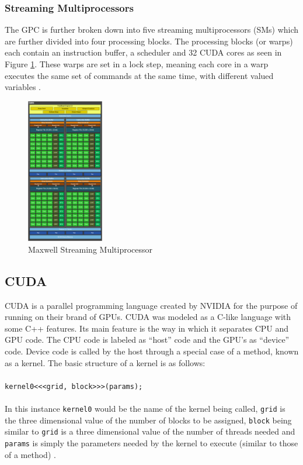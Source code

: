 \subsubsection{Streaming Multiprocessors}\label{gpu:ssec:smm}
The GPC is further broken down into five streaming multiprocessors (SMs) which are further divided into four processing blocks. The processing blocks (or warps) each contain an instruction buffer, a scheduler and 32 CUDA cores as seen in Figure \ref{gpu:img:smm}. These warps are set in a lock step, meaning each core in a warp executes the same set of commands at the same time, with different valued variables \citep{CUDA}.
%
\begin{figure}[H]
\centering
 \includegraphics[width=0.3\textwidth]{Images/GM107SMM.png}
 \caption[]{Maxwell Streaming Multiprocessor\footnotemark}
 \label{gpu:img:smm}
\end{figure}
\subsection{CUDA}\label{gpu:sec:cuda}
CUDA is a parallel programming language created by NVIDIA for the purpose of running on their brand of GPUs. CUDA was modeled as a C-like language with some C++ features. Its main feature is the way in which it separates CPU and GPU code. The CPU code is labeled as ``host'' code and the GPU's as ``device'' code. Device code is called by the host through a special case of a method, known as a kernel. The basic structure of a kernel is as follows: 
\\
\\
\texttt{kernel0<<<grid, block>>>(params);}
\\
\\
In this instance \texttt{kernel0} would be the name of the kernel being called, \texttt{grid} is the three dimensional value of the number of blocks to be assigned, \texttt{block} being similar to \texttt{grid} is a three dimensional value of the number of threads needed and \texttt{params} is simply the parameters needed by the kernel to execute (similar to those of a method) \citep{CUDA}.
%
